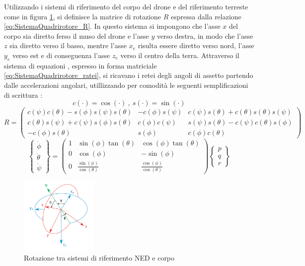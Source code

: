 Utilizzando i sistemi di riferimento del corpo del drone e del riferimento terreste come in figura \ref{fig:riferimenti}, si definisce la matrice di rotazione $R$ espressa dalla relazione \ref{eq:SistemaQuadrirotore_R}. In questo sistema si impongono che l'asse $x$ del corpo sia diretto ferso il muso del drone e l'asse $y$ verso destra, in modo che l'asse $z$ sia diretto verso il basso, mentre l'asse $x_e$ risulta essere diretto verso nord, l'asse $y_e$ verso est e di conseguenza l'asse $z_e$ verso il centro della terra. 
Attraverso il sistema di equazioni , espresso in forma matriciale \ref{eq:SistemaQuadrirotore_ratei}, si ricavano i retei degli angoli di assetto partendo dalle accelerazioni angolari, utillizzando per  comodità le seguenti semplificazioni di scrittura : 
\[ 	c(\cdot)=\cos(\cdot)\ ,\  s(\cdot) = \sin(\cdot) \]
\begin{equation}
R=
	\begin{pmatrix}
	c(\psi)c(\theta)-s(\phi)s(\psi)s(\theta) & -c(\phi)s(\psi) & c(\psi)s(\theta)+c(\theta)s(\theta)s(\psi) \\ 
	c(\theta) s(\psi)+c(\psi)s(\phi)s(\theta) & c(\phi)c(\psi) & s(\psi)s(\theta)-c(\psi)c(\theta)s(\phi) \\ 
	-c(\phi)s(\theta)	& s(\phi) & c(\phi)c(\theta)
	\end{pmatrix}
	\label{eq:SistemaQuadrirotore_R}
\end{equation}
\begin{equation}
	\begin{Bmatrix}
		\dot{\phi}\\
		\dot{\theta}\\
		\dot{\psi}
		\end{Bmatrix}=
	\begin{pmatrix}
		1 & \sin(\phi)\tan(\theta) & \cos(\phi)\tan(\theta) \\ 
		0 & \cos(\phi) & -\sin(\phi) \\ 
		0 & \frac{\sin(\phi)}{\cos(\theta)} & \frac{\cos(\phi)}{\cos(\theta)}
	\end{pmatrix}
	\begin{Bmatrix}
		p\\
		q\\
		r
	\end{Bmatrix}
	\label{eq:SistemaQuadrirotore_ratei}
\end{equation}

\begin{figure}
	\centering
	\includegraphics[width=0.33\textwidth]{SistemaQuadrirotore/Figure/eulerangles.png}
	\caption{Rotazione tra sistemi di riferimento NED e corpo}
	\label{fig:riferimenti}
\end{figure}

